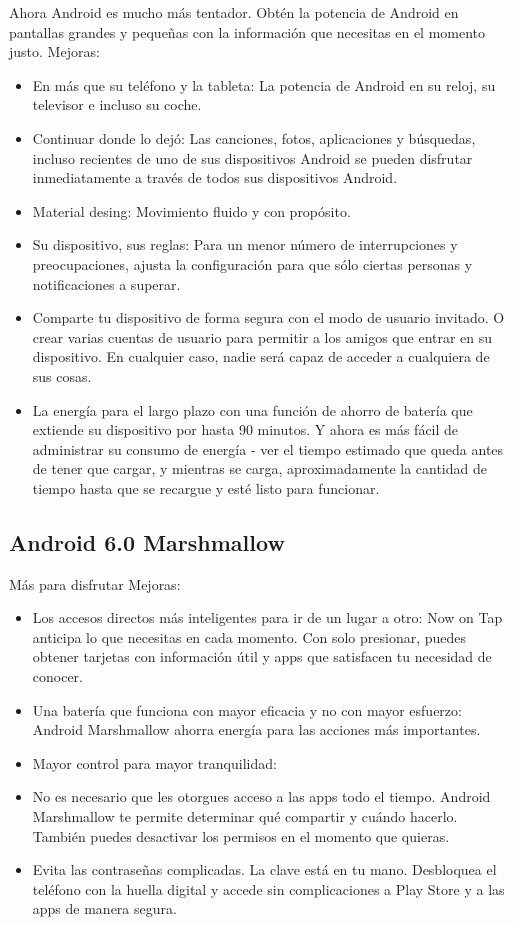 \documentclass[letterpaper,12pt,openany,oneside]{book}
\begin{document}
Ahora Android es mucho más tentador. Obtén la potencia de Android en pantallas grandes y pequeñas con la información que necesitas en el momento justo.
Mejoras:
\flushleft
\begin{itemize}
\item En más que su teléfono y la tableta: La potencia de Android en su reloj, su televisor e incluso su coche.
\item Continuar donde lo dejó: Las canciones, fotos, aplicaciones y búsquedas, incluso recientes de uno de sus dispositivos Android se pueden disfrutar inmediatamente a través de todos sus dispositivos Android.
\item Material desing: Movimiento fluido y con propósito.
\item Su dispositivo, sus reglas: Para un menor número de interrupciones y preocupaciones, ajusta la configuración para que sólo ciertas personas y notificaciones a superar.
\item Comparte tu dispositivo de forma segura con el modo de usuario invitado. O crear varias cuentas de usuario para permitir a los amigos que entrar en su dispositivo. En cualquier caso, nadie será capaz de acceder a cualquiera de sus cosas.
\item La energía para el largo plazo con una función de ahorro de batería que extiende su dispositivo por hasta 90 minutos. Y ahora es más fácil de administrar su consumo de energía - ver el tiempo estimado que queda antes de tener que cargar, y mientras se carga, aproximadamente la cantidad de tiempo hasta que se recargue  y esté  listo para funcionar.

\end{itemize}

\subsection{Android 6.0 Marshmallow}
Más para disfrutar
Mejoras:
\flushleft
\begin{itemize}

\item Los accesos directos más inteligentes para ir de un lugar a otro: Now on Tap anticipa lo que necesitas en cada momento. Con solo presionar, puedes obtener tarjetas con información útil y apps que satisfacen tu necesidad de conocer.
\item Una batería que funciona con mayor eficacia y no con mayor esfuerzo: Android Marshmallow ahorra energía para las acciones más importantes.
\item Mayor control para mayor tranquilidad: 
\item No es necesario que les otorgues acceso a las apps todo el tiempo. Android Marshmallow te permite determinar qué compartir y cuándo hacerlo. También puedes desactivar los permisos en el momento que quieras.
\item Evita las contraseñas complicadas. La clave está en tu mano. Desbloquea el teléfono con la huella digital y accede sin complicaciones a Play Store y a las apps de manera segura.
\end{itemize}
\end{document}
